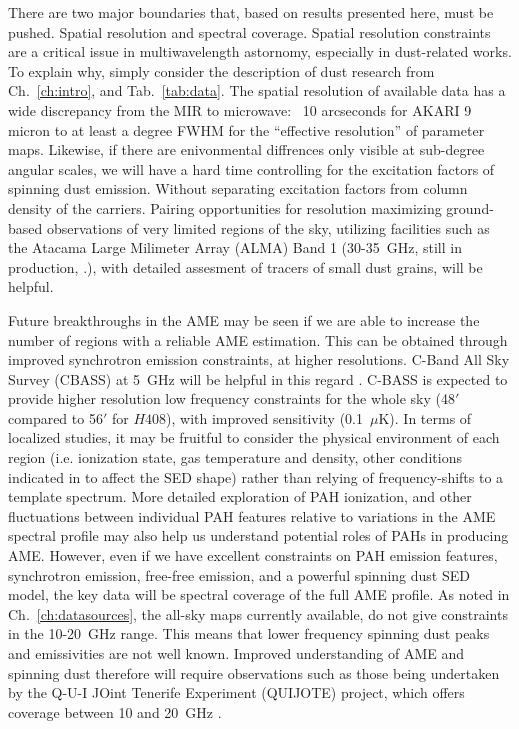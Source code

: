                 There are two major boundaries that, based on results presented here, must be pushed. Spatial resolution and spectral coverage.
                Spatial resolution constraints are a critical issue in multiwavelength astornomy, especially in dust-related works. To explain why, simply consider the description of dust research from Ch.~\ref{ch:intro}, and Tab.~\ref{tab:data}. The spatial resolution of available data has a wide discrepancy from the MIR to microwave: ~10 arcseconds for AKARI 9 micron to at least a degree FWHM for the ``effective resolution'' of parameter maps. Likewise, if there are enivonmental diffrences only visible at sub-degree angular scales, we will have a hard time controlling for the excitation factors of spinning dust emission. Without separating excitation factors from column density of the carriers. Pairing opportunities for resolution maximizing ground-based observations of very limited regions of the sky, utilizing facilities such as the Atacama Large Milimeter Array (ALMA) Band 1 (30-35~GHz, still in production, \cite{huang16}.), with detailed assesment of tracers of small dust grains, will be helpful.

                Future breakthroughs in the AME may be seen if we are able to increase the number of regions with a reliable AME estimation. This can be obtained through improved synchrotron emission constraints, at higher resolutions. C-Band All Sky Survey (CBASS) at 5~GHz will be helpful in this regard \citep{irfan15}. C-BASS is expected to provide higher resolution low frequency constraints for the whole sky (48$'$ compared to 56$'$ for $H408$), with improved sensitivity (0.1~$\mu$K). In terms of localized studies, it may be fruitful to consider the physical environment of each region (i.e. ionization state, gas temperature and density, other conditions indicated in \cite{draine98a, ali-haimoud10} to affect the SED shape) rather than relying of frequency-shifts to a template spectrum. More detailed exploration of PAH ionization, and other fluctuations between individual PAH features relative to variations in the AME spectral profile may also help us understand potential roles of PAHs in producing AME. However, even if we have excellent constraints on PAH emission features, synchrotron emission, free-free emission, and a powerful spinning dust SED model, the key data will be spectral coverage of the full AME profile. As noted in Ch.~\ref{ch:datasources}, the all-sky maps currently available, do not give constraints in the 10-20~GHz range. This means that lower frequency spinning dust peaks and emissivities are not well known. Improved understanding of AME and spinning dust therefore will require observations such as those being undertaken by the Q-U-I JOint Tenerife Experiment (QUIJOTE) project, which offers coverage between 10 and 20~GHz \citep{santos15}.
